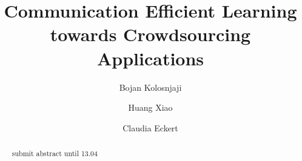 \documentclass{llncs}
\begin{document}
%
\frontmatter          %
%
%
\mainmatter              %
%
\title{Communication Efficient Learning towards Crowdsourcing Applications}
%
%
\author{Bojan  Kolosnjaji \and Huang Xiao 
	\and Claudia Eckert }
%
%
%

\maketitle              %

\begin{abstract}
submit  abstract until 13.04

\end{abstract}
%

%

%
\end{document}
